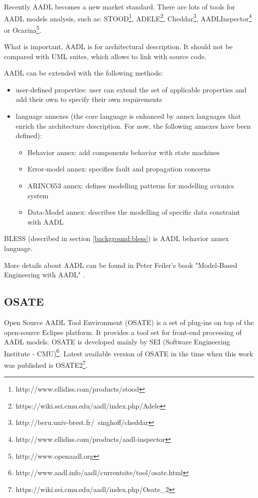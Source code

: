 Recently AADL becomes a new market standard. There are lots of tools for AADL models analysis, such as: STOOD\footnote{http://www.ellidiss.com/products/stood}, ADELE\footnote{https://wiki.sei.cmu.edu/aadl/index.php/Adele}, Cheddar\footnote{http://beru.univ-brest.fr/~singhoff/cheddar}, AADLInspector\footnote{http://www.ellidiss.com/products/aadl-inspector} or Ocarina\footnote{http://www.openaadl.org}.

What is important, AADL is for architectural description. It should not be compared with UML suites, which allows to link with source code.

AADL can be extended with the following methods:
\begin{itemize}
	\item user-defined properties: user can extend the set of applicable properties and add their own to specify their own requirements
	\item {language annexes (the core language is enhanced by annex languages that enrich the architecture description. For now, the following annexes have been defined):
		\begin{itemize}
			\item Behavior annex: add components behavior with state machines
			\item Error-model annex: specifies fault and propagation concerns
			\item ARINC653 annex: defines modelling patterns for modelling avionics system
			\item Data-Model annex: describes the modelling of specific data constraint with AADL
		\end{itemize}
		}
\end{itemize}

BLESS (described in section \ref{background:bless}) is AADL behavior annex language.

More details about AADL can be found in Peter Feiler's book "Model-Based Engineering with AADL" \cite{AadlBook}.


\subsection{OSATE}
\label{background:aadl:osate}

Open Source AADL Tool Environment (OSATE) is a set of plug-ins on top of the open-source Eclipse platform. It provides a tool set for front-end processing of AADL models. OSATE is developed mainly by SEI (Software Engineering Institute - CMU)\footnote{http://www.aadl.info/aadl/currentsite/tool/osate.html}. Latest available version of OSATE in the time when this work was published is OSATE2\footnote{https://wiki.sei.cmu.edu/aadl/index.php/Osate\_2}. 

